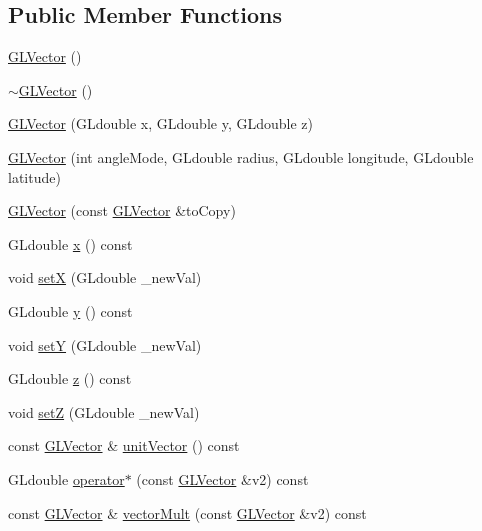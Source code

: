 \subsection*{\-Public \-Member \-Functions}
\begin{DoxyCompactItemize}
\item 
\hyperlink{classGLVector_ac747e4f072b314baeb6decc743ed1641}{\-G\-L\-Vector} ()
\item 
\hyperlink{classGLVector_ae2e7538b0fcd843aa8cb6fabbe28cd57}{$\sim$\-G\-L\-Vector} ()
\item 
\hyperlink{classGLVector_a1516a07954fdfa30ebb24813f3967df1}{\-G\-L\-Vector} (\-G\-Ldouble x, \-G\-Ldouble y, \-G\-Ldouble z)
\item 
\hyperlink{classGLVector_a2ec6b7a49e5432b1a02a3ab812ea23ae}{\-G\-L\-Vector} (int angle\-Mode, \-G\-Ldouble radius, \-G\-Ldouble longitude, \-G\-Ldouble latitude)
\item 
\hyperlink{classGLVector_a64ca3d25c4c8816232404e9f26f0bc12}{\-G\-L\-Vector} (const \hyperlink{classGLVector}{\-G\-L\-Vector} \&to\-Copy)
\item 
\-G\-Ldouble \hyperlink{classGLVector_a9b4fc967a1cb66fb7e1f3051e89b1534}{x} () const 
\item 
void \hyperlink{classGLVector_a12e21aad0a8b5b488fdb916a60025fdd}{set\-X} (\-G\-Ldouble \-\_\-new\-Val)
\item 
\-G\-Ldouble \hyperlink{classGLVector_a0636f988f49042bdfa9f60b885f6e028}{y} () const 
\item 
void \hyperlink{classGLVector_a0fbc57f57aeddaef676e7d49d9e9b698}{set\-Y} (\-G\-Ldouble \-\_\-new\-Val)
\item 
\-G\-Ldouble \hyperlink{classGLVector_abc3d9148eaab09624d4556edd06e77be}{z} () const 
\item 
void \hyperlink{classGLVector_ad3c42b990bbec3febff2e98bc19933f8}{set\-Z} (\-G\-Ldouble \-\_\-new\-Val)
\item 
const \hyperlink{classGLVector}{\-G\-L\-Vector} \& \hyperlink{classGLVector_a9743c9307046effd8535b2932cd5b247}{unit\-Vector} () const 
\item 
\-G\-Ldouble \hyperlink{classGLVector_a4c2a156755e478e9ca5978ac603f9f47}{operator$\ast$} (const \hyperlink{classGLVector}{\-G\-L\-Vector} \&v2) const 
\item 
const \hyperlink{classGLVector}{\-G\-L\-Vector} \& \hyperlink{classGLVector_a1279f7d991f0ee388403ff92f3d38df4}{vector\-Mult} (const \hyperlink{classGLVector}{\-G\-L\-Vector} \&v2) const 
\item 

\end{DoxyCompactItemize}
